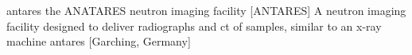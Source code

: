 \newglsXinstitution%
{antares}%
{the ANATARES neutron imaging facility}%
[ANTARES]%
{A neutron imaging facility designed to deliver radiographs and \gls{ct} of samples, similar to an \gls{x-ray} machine \cite{website:Antares}}%
{antares}%
[Garching, Germany]%